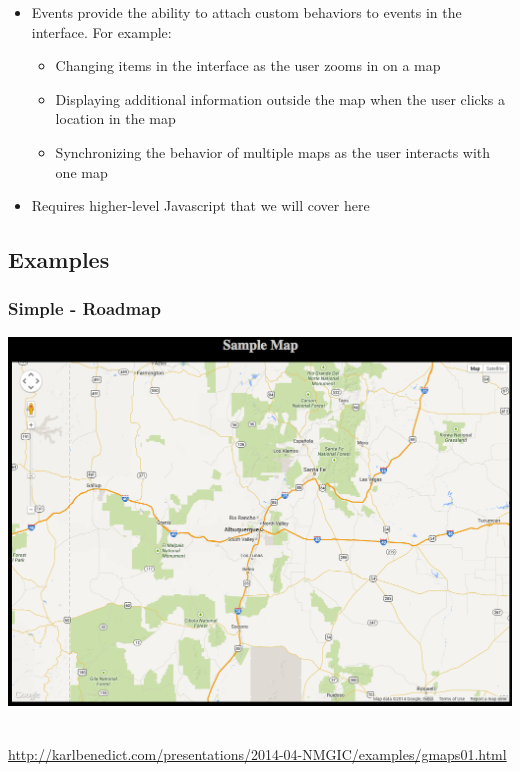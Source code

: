\documentclass[]{article}
\begin{document}
\begin{itemize}
\itemsep1pt\parskip0pt
\item
  Events provide the ability to attach custom behaviors to events in the
  interface. For example:

  \begin{itemize}
  \itemsep1pt\parskip0pt
  \item
    Changing items in the interface as the user zooms in on a map
  \item
    Displaying additional information outside the map when the user
    clicks a location in the map
  \item
    Synchronizing the behavior of multiple maps as the user interacts
    with one map
  \end{itemize}
\item
  Requires higher-level Javascript that we will cover here
\end{itemize}

\subsection{Examples}\label{examples}

\subsubsection{Simple - Roadmap}\label{simple---roadmap}

\includegraphics{images/google_01.jpg}~

\url{http://karlbenedict.com/presentations/2014-04-NMGIC/examples/gmaps01.html}
\end{document}
